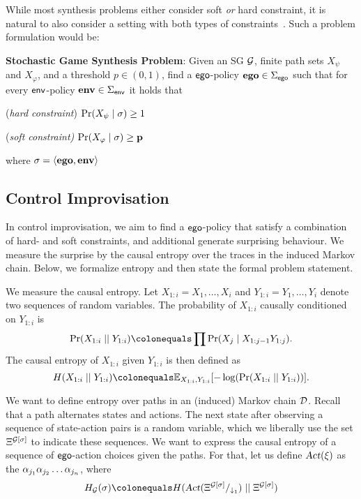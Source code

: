 {{\begin{example}
\end{example}

While most synthesis problems either consider soft \emph{or} hard constraint, it is natural to also consider a setting with both types of constraints~\cite{}. Such a problem formulation would be:
\begin{mdframed}{}
\textbf{Stochastic Game Synthesis Problem}:
Given an SG $\mathcal{G}$, finite path sets $X_\psi$ and $X_\varphi$, and a threshold $p \in (0,1)$,  find a $\mathsf{ego}$-policy $\mathbf{ego} \in \Sigma_{\mathsf{ego}}$  such that for every $\mathsf{env}$-policy $\mathbf{env} \in \Sigma_{\mathsf{env}}$ it holds that 
\begin{compactenum}
	\item (\emph{hard constraint}) $\Pr(X_\psi \mid \sigma) \geq 1$
	\item (\emph{soft constraint)} $\Pr(X_\varphi \mid \sigma) \geq \mathbf{p}$
\end{compactenum}
 where $\sigma = \langle \mathbf{ego}, \mathbf{env} \rangle$
\end{mdframed}




\subsection{Control Improvisation}
In control improvisation, we aim to find a $\mathsf{ego}$-policy that satisfy a combination of hard- and soft constraints, and additional generate surprising behaviour. We measure the surprise by the causal entropy over the traces in the induced Markov chain. Below, we formalize entropy and then state the formal problem statement. 

We measure the causal entropy. Let $X_{1:i} = X_1, \hdots, X_i$ and $Y_{1:i} = Y_1,\hdots,Y_i$ denote two sequences of random variables. The probability of $ X_{1:i}$ causally conditioned on $Y_{1:i}$ is 
\[ \causalprob{X_{1:i}}{Y_{1:i}} \colonequals \prod \Pr(X_j \mid X_{1:j-1}Y_{1:j}). \]
The causal entropy of $X_{1:i}$ given $Y_{1:i}$ is then defined as 
\[  H(X_{1:i}\mid\mid Y_{1:i}) \colonequals \expOver{X_{1:i},Y_{1:i}}{-\log(\causalprob{X_{1:i}}{Y_{1:i}})}.\] 

We want to define entropy over paths in an (induced) Markov chain $\mathcal{D}$. Recall that a path alternates states and actions. The next state after observing a sequence of state-action pairs is a random variable, which we liberally use the set $\Xi^{\mathcal{G}[\sigma]}_{}$ to indicate these sequences.  We want to express the causal entropy of a sequence of $\mathsf{ego}$-action choices given the paths. For that, let us define $\textsl{Act}(\xi)$ as the $\alpha_{j_1} \alpha_{j_2} \hdots \alpha_{j_n}$, where 
\[ H_\sg(\sigma) \colonequals H( \textsl{Act}(\POnePaths{\sg[\sched]})   \mid\mid \Paths{\sg[\sched]} )  \]


}}
